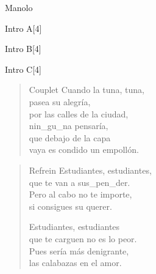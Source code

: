 \begin{song}{Manolo}
\begin{instrumental}{Intro A}[4]
\measure{}\measure{}
\measure{}
\end{instrumental}

\begin{instrumental}{Intro B}[4]
\measure{}\measure{}
\measure{}
\end{instrumental}

\begin{instrumental}{Intro C}[4]
\measure{}
\measure{}
\measure{}
\measure{}
\end{instrumental}

\begin{verse}{Couplet}
Cuando la tuna, tuna,\\
pasea su alegría,\\
por las calles de la ciudad,\\
nin\_gu\_na pensaría,\\
que debajo de la capa\\
vaya es condido un empollón.
\end{verse}
\begin{verse}{Refrein}
Estudiantes, estudiantes,\\
que te van a sus\_pen\_der.\\
\chord{}Pero al cabo no te importe,\\
si consigues su querer.\vspace{\wlskip}

Estudiantes, estudiantes\\
que te carguen no es lo peor.\\
Pues sería \hspace{0.5em}\hspace{2em} más denigrante,\hspace{1em}\\
las calabazas\hspace{0.5em}\hspace{2em} en el amor.\hspace{1em}\hspace{2em}
\end{verse}
\end{song}

